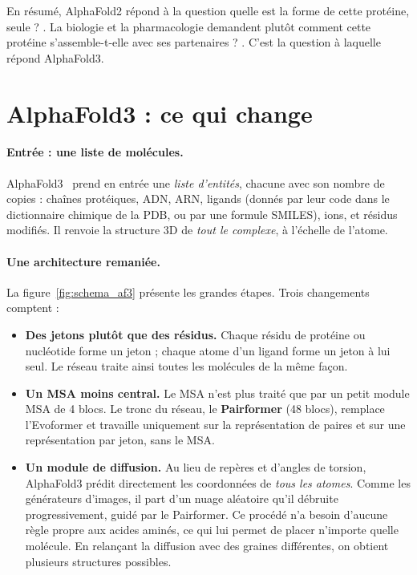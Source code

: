 En résumé, AlphaFold2 répond à la question \og quelle est la forme de cette protéine, seule ? \fg{}. La biologie et la pharmacologie demandent plutôt \og comment cette protéine s'assemble-t-elle avec ses partenaires ? \fg{}. C'est la question à laquelle répond AlphaFold3.

\section{AlphaFold3 : ce qui change}

\paragraph{Entrée : une liste de molécules.} AlphaFold3~\cite{abramson2024} prend en entrée une \emph{liste d'entités}, chacune avec son nombre de copies : chaînes protéiques, ADN, ARN, ligands (donnés par leur code dans le dictionnaire chimique de la PDB, ou par une formule SMILES), ions, et résidus modifiés. Il renvoie la structure 3D de \emph{tout le complexe}, à l'échelle de l'atome.

\paragraph{Une architecture remaniée.} La figure~\ref{fig:schema_af3} présente les grandes étapes. Trois changements comptent :
\begin{itemize}
  \item \textbf{Des jetons plutôt que des résidus.} Chaque résidu de protéine ou nucléotide forme un jeton ; chaque atome d'un ligand forme un jeton à lui seul. Le réseau traite ainsi toutes les molécules de la même façon.
  \item \textbf{Un MSA moins central.} Le MSA n'est plus traité que par un petit \og module MSA \fg{} de 4 blocs. Le tronc du réseau, le \textbf{Pairformer} (48 blocs), remplace l'Evoformer et travaille uniquement sur la représentation de paires et sur une représentation par jeton, sans le MSA.
  \item \textbf{Un module de diffusion.} Au lieu de repères et d'angles de torsion, AlphaFold3 prédit directement les coordonnées de \emph{tous les atomes}. Comme les générateurs d'images, il part d'un nuage aléatoire qu'il \og débruite \fg{} progressivement, guidé par le Pairformer. Ce procédé n'a besoin d'aucune règle propre aux acides aminés, ce qui lui permet de placer n'importe quelle molécule. En relançant la diffusion avec des graines différentes, on obtient plusieurs structures possibles.
\end{itemize}

